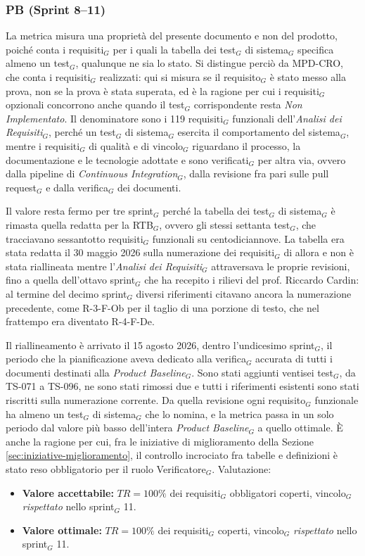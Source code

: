 \documentclass[a4paper, 10pt, colorlinks=true, linkcolor=black, urlcolor=blue, citecolor=blue, hidelinks]{article}
\begin{document}
\subsubsection{PB (Sprint 8--11)}
La metrica misura una proprietà del presente documento e non del prodotto, poiché conta i requisiti$_G$ per i quali la tabella dei test$_G$ di sistema$_G$ specifica almeno un test$_G$, qualunque ne sia lo stato. Si distingue perciò da MPD-CRO, che conta i requisiti$_G$ realizzati: qui si misura se il requisito$_G$ è stato messo alla prova, non se la prova è stata superata, ed è la ragione per cui i requisiti$_G$ opzionali concorrono anche quando il test$_G$ corrispondente resta \textit{Non Implementato}. Il denominatore sono i 119 requisiti$_G$ funzionali dell'\textit{Analisi dei Requisiti}$_G$, perché un test$_G$ di sistema$_G$ esercita il comportamento del sistema$_G$, mentre i requisiti$_G$ di qualità e di vincolo$_G$ riguardano il processo, la documentazione e le tecnologie adottate e sono verificati$_G$ per altra via, ovvero dalla pipeline di \textit{Continuous Integration}$_G$, dalla revisione fra pari sulle pull request$_G$ e dalla verifica$_G$ dei documenti.

Il valore resta fermo per tre sprint$_G$ perché la tabella dei test$_G$ di sistema$_G$ è rimasta quella redatta per la RTB$_G$, ovvero gli stessi settanta test$_G$, che tracciavano sessantotto requisiti$_G$ funzionali su centodiciannove. La tabella era stata redatta il 30 maggio 2026 sulla numerazione dei requisiti$_G$ di allora e non è stata riallineata mentre l'\textit{Analisi dei Requisiti}$_G$ attraversava le proprie revisioni, fino a quella dell'ottavo sprint$_G$ che ha recepito i rilievi del prof. Riccardo Cardin: al termine del decimo sprint$_G$ diversi riferimenti citavano ancora la numerazione precedente, come R-3-F-Ob per il taglio di una porzione di testo, che nel frattempo era diventato R-4-F-De.

Il riallineamento è arrivato il 15 agosto 2026, dentro l'undicesimo sprint$_G$, il periodo che la pianificazione aveva dedicato alla verifica$_G$ accurata di tutti i documenti destinati alla \textit{Product Baseline}$_G$. Sono stati aggiunti ventisei test$_G$, da TS-071 a TS-096, ne sono stati rimossi due e tutti i riferimenti esistenti sono stati riscritti sulla numerazione corrente. Da quella revisione ogni requisito$_G$ funzionale ha almeno un test$_G$ di sistema$_G$ che lo nomina, e la metrica passa in un solo periodo dal valore più basso dell'intera \textit{Product Baseline}$_G$ a quello ottimale. È anche la ragione per cui, fra le iniziative di miglioramento della Sezione \ref{sec:iniziative-miglioramento}, il controllo incrociato fra tabelle e definizioni è stato reso obbligatorio per il ruolo Verificatore$_G$. Valutazione:
\begin{itemize}
    \item \textbf{Valore accettabile:} $TR = 100\%$ dei requisiti$_G$ obbligatori coperti, vincolo$_G$ \textit{rispettato} nello sprint$_G$ 11.
    \item \textbf{Valore ottimale:} $TR = 100\%$ dei requisiti$_G$ coperti, vincolo$_G$ \textit{rispettato} nello sprint$_G$ 11.
\end{itemize}
\end{document}
